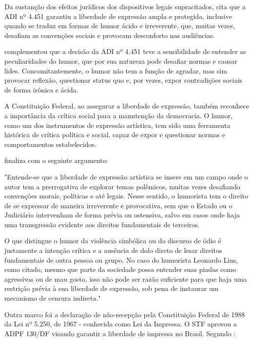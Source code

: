Da sustanção dos efeitos jurídicos dos dispositivos legais supracitados, \cite{liberdade_expressao_artistica_tjrs} cita que a ADI nº 4.451 garantiu a liberdade de expressão ampla e protegida, inclusive quando se traduz em formas de humor ácido e irreverente, que, muitas vezes, desafiam as convenções sociais e provocam desconforto nas audiências.

\cite{liberdade_expressao_artistica_tjrs} complementou que a decisão da ADI nº 4.451 teve a sensibilidade de entender as peculiaridades do humor, que por sua natureza pode desafiar normas e causar lides. Concomitantemente, o humor não tem a função de agradar, mas sim provocar reflexão, questionar status quo e, por vezes, expor contradições sociais de forma irônica e ácida.

A Constituição Federal, ao assegurar a liberdade de expressão, também reconhece a importância da crítica social para a manutenção da democracia. O humor, como um dos instrumentos de expressão artística, tem sido uma ferramenta histórica de crítica política e social, capaz de expor e questionar normas e comportamentos estabelecidos.

\cite{liberdade_expressao_artistica_tjrs} finaliza com o seguinte argumento:

\noindent
\begin{flushleft}
	\setlength{\leftskip}{4cm}
	\small
	"Entende-se que a liberdade de expressão artística se insere em um campo onde o autor tem a prerrogativa de explorar temas polêmicos, muitas vezes desafiando convenções morais, políticas e até legais. Nesse sentido, o humorista tem o direito de se expressar de maneira irreverente e provocativa, sem que o Estado ou o Judiciário intervenham de forma prévia ou ostensiva, salvo em casos onde haja uma transgressão evidente aos direitos fundamentais de terceiros.
	
	O que distingue o humor da violência simbólica ou do discurso de ódio é justamente a intenção crítica e a ausência de dolo direto de lesar direitos fundamentais de outra pessoa ou grupo. No caso do humorista Leonardo Lins, como citado, mesmo que parte da sociedade possa entender suas piadas como agressivas ou de mau gosto, isso não pode ser razão suficiente para que haja uma restrição prévia à sua liberdade de expressão, sob pena de instaurar um mecanismo de censura indireta." \cite{liberdade_expressao_artistica_tjrs}
\end{flushleft}

Outra marco foi a declaração de não-recepção pela Constituição Federal de 1988 da Lei nº 5.250, de 1967 - conhecida como Lei da Impressa. O STF aprovou a ADPF 130/DF visando garantir a liberdade de impressa no Brasil. Segundo \cite{adpf130}:

